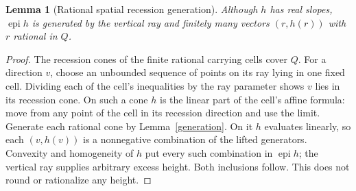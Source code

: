 \documentclass[11pt]{article}
\newtheorem{lemma}[theorem]{Lemma}
\theoremstyle{definition}\newtheorem{definition}[theorem]{Definition}
\theoremstyle{remark}\newtheorem{remark}[theorem]{Remark}
\newcommand{\epi}{\operatorname{epi}}\newcommand{\conv}{\operatorname{conv}}
\begin{document}
\begin{lemma}[Rational spatial recession generation]\label{rays}
Although $h$ has real slopes, $\epi h$ is generated by the vertical ray and finitely many vectors $(r,h(r))$ with $r$ rational in $Q$.
\end{lemma}
\begin{proof}
The recession cones of the finite rational carrying cells cover $Q$. For a direction $v$, choose an unbounded sequence of points on its ray lying in one fixed cell. Dividing each of the cell's inequalities by the ray parameter shows $v$ lies in its recession cone. On such a cone $h$ is the linear part of the cell's affine formula: move from any point of the cell in its recession direction and use the limit. Generate each rational cone by Lemma~\ref{generation}. On it $h$ evaluates linearly, so each $(v,h(v))$ is a nonnegative combination of the lifted generators. Convexity and homogeneity of $h$ put every such combination in $\epi h$; the vertical ray supplies arbitrary excess height. Both inclusions follow. This does not round or rationalize any height.
\end{proof}
\end{document}
